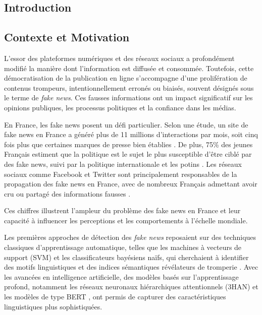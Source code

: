 \documentclass[a4paper,12pt, twocolumn]{article}
\begin{document}
\begin{twocolumn}
\section{Introduction}
\label{chap:introduction}

\subsection{Contexte et Motivation}
L’essor des plateformes numériques et des réseaux sociaux a profondément modifié la manière dont l’information est diffusée et consommée. Toutefois, cette démocratisation de la publication en ligne s’accompagne d’une prolifération de contenus trompeurs, intentionnellement erronés ou biaisés, souvent désignés sous le terme de \textit{fake news}. Ces fausses informations ont un impact significatif sur les opinions publiques, les processus politiques et la confiance dans les médias.

En France, les fake news posent un défi particulier. Selon une étude, un site de fake news en France a généré plus de 11 millions d'interactions par mois, soit cinq fois plus que certaines marques de presse bien établies \cite{reuterfake}. De plus, 75\% des jeunes Français estiment que la politique est le sujet le plus susceptible d'être ciblé par des fake news, suivi par la politique internationale et les potins \cite{statista_fake_news}. Les réseaux sociaux comme Facebook et Twitter sont principalement responsables de la propagation des fake news en France, avec de nombreux Français admettant avoir cru ou partagé des informations fausses \cite{statista_spread, reuterfake}.

Ces chiffres illustrent l'ampleur du problème des fake news en France et leur capacité à influencer les perceptions et les comportements à l'échelle mondiale.

Les premières approches de détection des \textit{fake news} reposaient sur des techniques classiques d’apprentissage automatique, telles que les machines à vecteurs de support (SVM) et les classificateurs bayésiens naïfs, qui cherchaient à identifier des motifs linguistiques et des indices sémantiques révélateurs de tromperie \cite{conroy_automatic_2015}. Avec les avancées en intelligence artificielle, des modèles basés sur l’apprentissage profond, notamment les réseaux neuronaux hiérarchiques attentionnels (3HAN) \cite{singhania_3han_2017} et les modèles de type BERT \cite{kaliyar_fakebert_2021}, ont permis de capturer des caractéristiques linguistiques plus sophistiquées.


\end{twocolumn}
\end{document}
